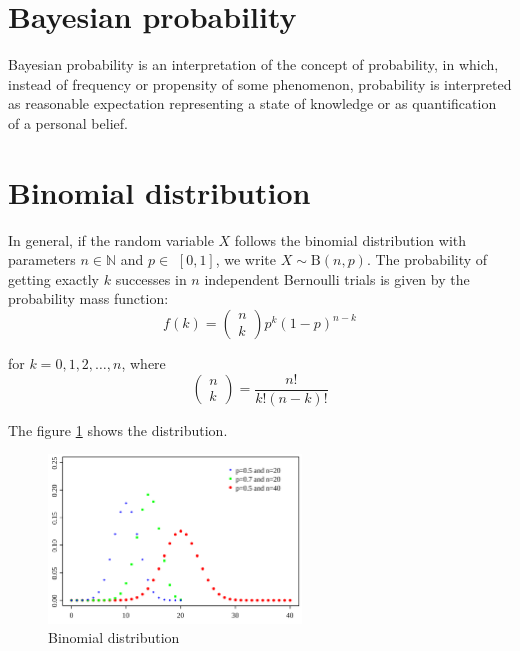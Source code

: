 \section{Bayesian probability}
\label{sec:bayesian-probability}

Bayesian probability is an interpretation of the concept of probability, in which, instead of frequency or propensity of some phenomenon, probability is interpreted as reasonable expectation representing a state of knowledge or as quantification of a personal belief.

\section{Binomial distribution}
\label{sec:binom-distr}

In general, if the random variable $X$ follows the binomial distribution with parameters $n \in \mathbb{N}$ and $p \in$ $[0,1]$, we write $X \sim \mathrm{B}(n, p)$.
The probability of getting exactly $k$ successes in $n$ independent Bernoulli trials is given by the probability mass function:
\begin{equation}
  \label{eq:24}
  f(k)=\left(\begin{array}{l}
               n \\
               k
             \end{array}\right) p^k(1-p)^{n-k}
\end{equation}

for $k=0,1,2, \ldots, n$, where
\begin{equation}
  \label{eq:25}
\left(\begin{array}{l}
n \\
k
\end{array}\right)=\frac{n !}{k !(n-k) !}
\end{equation}

The figure \ref{fig:binomial-distribution} shows the distribution.
\begin{figure}[!htp]
  \centering
  \includegraphics[width=0.6\textwidth]{images/binomian-distribution.png}
  \caption{Binomial distribution}
  \label{fig:binomial-distribution}
\end{figure}

